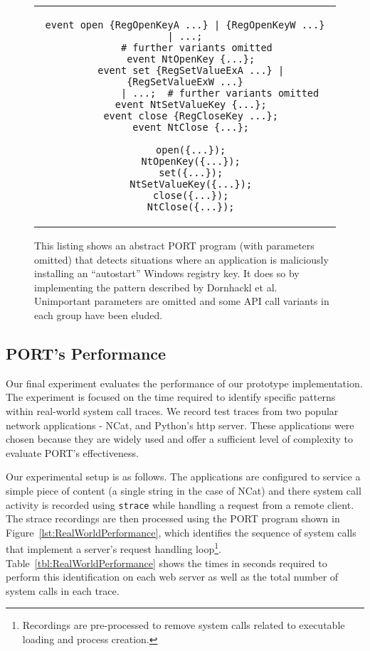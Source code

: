 \begin{figure}
\centering
\begin{tabular}{c}
\begin{lstlisting}[gobble=2]
  event open {RegOpenKeyA ...} | {RegOpenKeyW ...} | ...;
    # further variants omitted
  event NtOpenKey {...};
  event set {RegSetValueExA ...} | {RegSetValueExW ...}
            | ...;  # further variants omitted
  event NtSetValueKey {...};
  event close {RegCloseKey ...};
  event NtClose {...};

  open({...});
  NtOpenKey({...});
  set({...});
  NtSetValueKey({...});
  close({...});
  NtClose({...});
\end{lstlisting}
\end{tabular}
  \caption{This listing shows an abstract PORT program (with parameters
  omitted) that detects situations where an application is maliciously
  installing an ``autostart'' Windows registry key.  It does so by
  implementing the pattern described by Dornhackl et al.  Unimportant
  parameters are omitted and some API call variants in each group have been
  eluded.}
\label{lst:PORTRegDetect}
\end{figure}


\subsection{PORT's Performance}

Our final experiment evaluates the performance of our prototype implementation.
The experiment is focused on the time required
to identify specific
patterns within real-world system call traces.
We record test traces
from two popular network applications -
NCat,
and
Python's http server.
These applications
were chosen because they are widely used and
offer a sufficient level of complexity to evaluate
PORT's effectiveness.

Our experimental setup is as follows.  The applications are configured to service
a simple piece of content (a single string in the case of NCat) and there system call activity is
recorded using {\tt strace} while handling a request from a remote client.
The strace recordings are then processed using the PORT program shown in
Figure~\ref{lst:RealWorldPerformance},  which
identifies the sequence of system calls that implement
a server's request handling loop\footnote{Recordings are pre-processed to remove system calls
related to executable loading and process creation.}.  Table~\ref{tbl:RealWorldPerformance}
shows the times in seconds required to perform this identification on each
web server as well as the total number of system calls in each trace.

